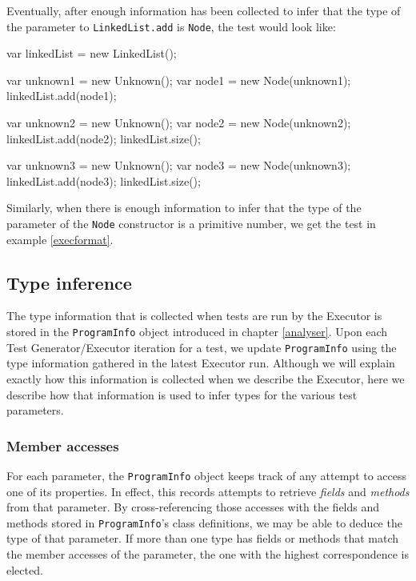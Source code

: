 Eventually, after enough information has been collected to infer that the type of the parameter to \texttt{LinkedList.add} is \texttt{Node}, the test would look like:

\begin{code}[caption=After type inference for \texttt{LinkedList.add}, label=firstinference]
   var linkedList = new LinkedList();
   
   var unknown1 = new Unknown();
   var node1 = new Node(unknown1);
   linkedList.add(node1);
   
   var unknown2 = new Unknown();
   var node2 = new Node(unknown2);
   linkedList.add(node2);
   linkedList.size();

   var unknown3 = new Unknown();
   var node3 = new Node(unknown3);
   linkedList.add(node3);
   linkedList.size();
\end{code}

Similarly, when there is enough information to infer that the type of the parameter of the \texttt{Node} constructor is a primitive number, we get the test in example \ref{execformat}.

\subsection{Type inference}
The type information that is collected when tests are run by the \textsf{Executor} is stored in the \texttt{ProgramInfo} object introduced in chapter \ref{analyser}. Upon each \textsf{Test Generator}/\textsf{Executor} iteration for a test, we update \texttt{ProgramInfo} using the type information gathered in the latest \textsf{Executor} run. Although we will explain exactly how this information is collected when we describe the \textsf{Executor}, here we describe how that information is used to infer types for the various test parameters.

\subsubsection{Member accesses}
For each parameter, the \texttt{ProgramInfo} object keeps track of any attempt to access one of its properties. In effect, this records attempts to retrieve \emph{fields} and \emph{methods} from that parameter. By cross-referencing those accesses with the fields and methods stored in \texttt{ProgramInfo}'s class definitions, we may be able to deduce the type of that parameter. If more than one type has fields or methods that match the member accesses of the parameter, the one with the highest correspondence is elected.


